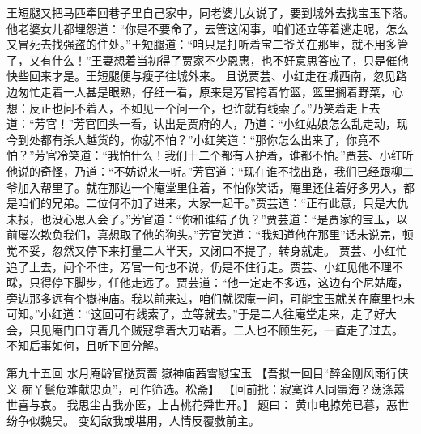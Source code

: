 \documentclass[12pt,oneside]{book}
\begin{document}
王短腿又把马匹牵回巷子里自己家中，同老婆儿女说了，要到城外去找宝玉下落。他老婆女儿都埋怨道：“你是不要命了，去管这闲事，咱们还立等着逃走呢，怎么又冒死去找强盗的住处。”王短腿道：“咱只是打听着宝二爷关在那里，就不用多管了，又有什么！”王妻想着当初得了贾家不少恩惠，也不好意思答应了，只是催他快些回来才是。王短腿便与瘦子往城外来。
且说贾芸、小红走在城西南，忽见路边匆忙走着一人甚是眼熟，仔细一看，原来是芳官挎着竹篮，篮里搁着野菜，心想：反正也问不着人，不如见一个问一个，也许就有线索了。”乃笑着走上去道：“芳官！”芳官回头一看，认出是贾府的人，乃道：“小红姑娘怎么乱走动，现今到处都有杀人越货的，你就不怕？”小红笑道：“那你怎么出来了，你竟不怕？”芳官冷笑道：“我怕什么！我们十二个都有人护着，谁都不怕。”贾芸、小红听他说的奇怪，乃道：“不妨说来一听。”芳官道：“现在谁不找出路，我们已经跟柳二爷加入帮里了。就在那边一个庵堂里住着，不怕你笑话，庵里还住着好多男人，都是咱们的兄弟。二位何不加了进来，大家一起干。”贾芸道：“正有此意，只是大仇未报，也没心思入会了。”芳官道：“你和谁结了仇？”贾芸道：“是贾家的宝玉，以前屡次欺负我们，真想取了他的狗头。”芳官笑道：“我知道他在那里”话未说完，顿觉不妥，忽然又停下来打量二人半天，又闭口不提了，转身就走。
贾芸、小红忙追了上去，问个不住，芳官一句也不说，仍是不住行走。贾芸、小红见他不理不睬，只得停下脚步，任他走远了。贾芸道：“他一定走不多远，这边有个尼姑庵，旁边那多远有个嶽神庙。我以前来过，咱们就探庵一问，可能宝玉就关在庵里也未可知。”小红道：“这回可有线索了，立等就去。”于是二人往庵堂走来，走了好大会，只见庵门口守着几个贼寇拿着大刀站着。二人也不顾生死，一直走了过去。
不知后事如何，且听下回分解。 
 
第九十五回 水月庵龄官挞贾蔷 嶽神庙茜雪慰宝玉
【吾拟一回目“醉金刚风雨行侠义 痴丫鬟危难献忠贞”，可作筛选。松斋】
【回前批：寂寞谁人同蜃海？荡涤嚣世喜与哀。
我思尘古我亦匿，上古桃花舜世开。】
题曰：
黄巾电掠苑已暮，恶世纷争似魏吴。
变幻敌我或堪用，人情反覆救前主。
\end{document}
